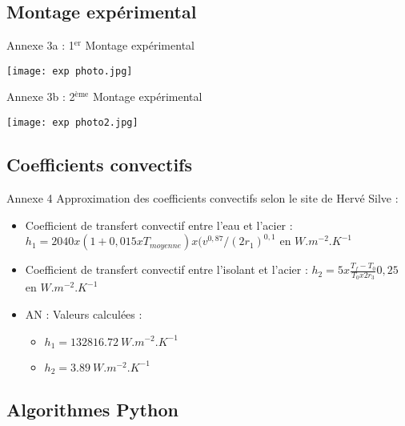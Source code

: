 \documentclass[hyperref={pdfpagelabels=false}]{beamer}
\begin{document}
\subsection*{Montage expérimental}\label{a3}

\begin{frame}{Annexe 3a : 1$^{\text{er}}$ Montage expérimental {\textcolor{ultramarine}{\hyperlink{e13}{}}} }
\begin{center}
\texttt{[image: exp photo.jpg]}
 \label{fig}
\end{center}
\end{frame}
\begin{frame}{Annexe 3b : 2$^{\text{ème}}$ Montage expérimental {\textcolor{ultramarine}{\hyperlink{e13}{}}} }
\begin{center}
\texttt{[image: exp photo2.jpg]}
 \label{fig}
\end{center}
\end{frame}

\subsection*{Coefficients convectifs}\label{a4}

\begin{frame}{Annexe 4 {\textcolor{ultramarine}{\hyperlink{grd}{}}} }
Approximation des coefficients convectifs selon le site de Hervé Silve :
\begin{itemize}
\item Coefficient de transfert convectif entre l'eau et l'acier : $h_1 = 2040 x (1 + 0,015 x T_{moyenne}) x (v^{0,87} / (2 r_1)^{0,1}$ en $W.m^{-2}.K^{-1}$
\item Coefficient de transfert convectif entre l'isolant et l'acier : 
$ h_2 = 5 x \frac{T_f - T_0}{T_0 x 2 r_3} 0,25$ en $W.m^{-2}.K^{-1}$
\item AN : Valeurs calculées : \begin{itemize}
\item $h_1 = 132816.72 ~W.m^{-2}.K^{-1}$
\item $h_2 = 3.89~W.m^{-2}.K^{-1}$
\end{itemize} 
\end{itemize}
\end{frame}

\subsection*{Algorithmes Python}\label{a5}
\end{document}

